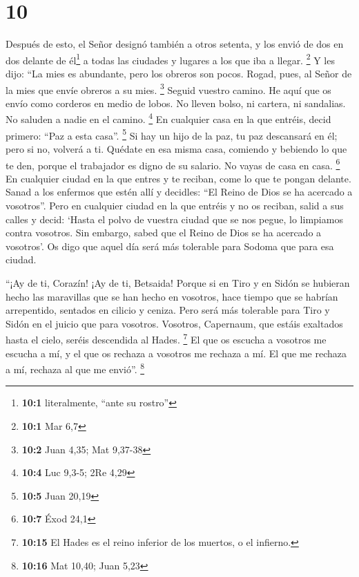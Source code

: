 \hypertarget{section-9}{%
\section{10}\label{section-9}}

 Después de esto, el Señor designó también a otros
setenta, y los envió de dos en dos delante de él\footnote{\textbf{10:1}
  literalmente, ``ante su rostro''} a todas las ciudades y lugares a los
que iba a llegar. \footnote{\textbf{10:1} Mar 6,7}  Y les
dijo: ``La mies es abundante, pero los obreros son pocos. Rogad, pues,
al Señor de la mies que envíe obreros a su mies. \footnote{\textbf{10:2}
  Juan 4,35; Mat 9,37-38}  Seguid vuestro camino. He aquí
que os envío como corderos en medio de lobos.  No lleven
bolso, ni cartera, ni sandalias. No saluden a nadie en el camino.
\footnote{\textbf{10:4} Luc 9,3-5; 2Re 4,29}  En cualquier
casa en la que entréis, decid primero: ``Paz a esta casa''. \footnote{\textbf{10:5}
  Juan 20,19}  Si hay un hijo de la paz, tu paz descansará
en él; pero si no, volverá a ti.  Quédate en esa misma
casa, comiendo y bebiendo lo que te den, porque el trabajador es digno
de su salario. No vayas de casa en casa. \footnote{\textbf{10:7} Éxod
  24,1}  En cualquier ciudad en la que entres y te
reciban, come lo que te pongan delante.  Sanad a los
enfermos que estén allí y decidles: ``El Reino de Dios se ha acercado a
vosotros''.  Pero en cualquier ciudad en la que entréis y
no os reciban, salid a sus calles y decid:  `Hasta el
polvo de vuestra ciudad que se nos pegue, lo limpiamos contra vosotros.
Sin embargo, sabed que el Reino de Dios se ha acercado a vosotros'.
 Os digo que aquel día será más tolerable para Sodoma que
para esa ciudad.

 ``¡Ay de ti, Corazín! ¡Ay de ti, Betsaida! Porque si en
Tiro y en Sidón se hubieran hecho las maravillas que se han hecho en
vosotros, hace tiempo que se habrían arrepentido, sentados en cilicio y
ceniza.  Pero será más tolerable para Tiro y Sidón en el
juicio que para vosotros.  Vosotros, Capernaum, que
estáis exaltados hasta el cielo, seréis descendida al Hades. \footnote{\textbf{10:15}
  El Hades es el reino inferior de los muertos, o el infierno.}
 El que os escucha a vosotros me escucha a mí, y el que
os rechaza a vosotros me rechaza a mí. El que me rechaza a mí, rechaza
al que me envió''. \footnote{\textbf{10:16} Mat 10,40; Juan 5,23}

